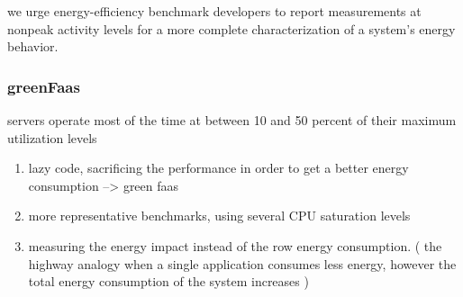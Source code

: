 we urge energy-efficiency benchmark developers to report measurements at nonpeak activity levels for a more complete characterization of a system's energy behavior\cite{barroso2007case}.


\subsubsection*{greenFaas}
servers operate most of the time at between 10 and 50 percent of their maximum utilization levels \cite{barroso2007case}


\begin{enumerate}

      \item lazy code, sacrificing the performance in order to get a better energy consumption --> green faas
      \item more representative benchmarks, using several CPU saturation levels
      \item measuring the energy impact instead of the row energy consumption. ( the highway analogy when a single application consumes less energy, however the total energy consumption of the system increases )
\end{enumerate}
\vfill \strut  %
\cleardoublepage